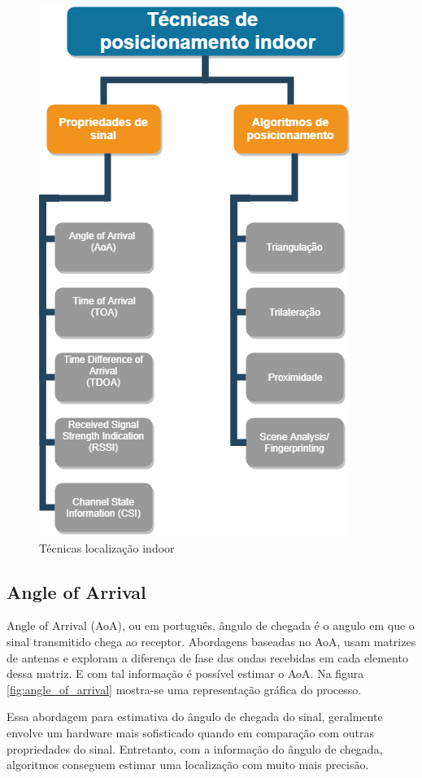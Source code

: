 \begin{figure}[H]
	\centering 
	\includegraphics[scale = 0.4]{images/tecnicas_posicionamento_indoor.png}
	\caption{Técnicas localização indoor}
	\label{fig:tecnicas_posicionamento_indoor}
  \end{figure}


\subsection{Angle of Arrival}

Angle of Arrival (AoA), ou em português, ângulo de chegada é o angulo em que o sinal transmitido chega ao receptor. Abordagens baseadas no AoA, usam matrizes de antenas e exploram a diferença de fase das ondas recebidas em cada elemento dessa matriz. E com tal informação é possível estimar o AoA. Na figura \ref{fig:angle_of_arrival} mostra-se uma representação gráfica do processo.

Essa abordagem para estimativa do ângulo de chegada do sinal, geralmente envolve um hardware mais sofisticado quando em comparação com outras propriedades do sinal. Entretanto, com a informação do ângulo de chegada, algoritmos conseguem estimar uma localização com muito mais precisão.\cite{art2}

